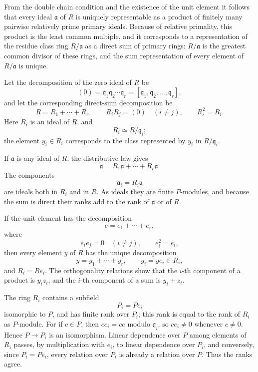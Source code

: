 \documentclass[11pt]{article}
\begin{document}
From the double chain condition and the existence of the unit element it
follows that every ideal \(\mathfrak a\) of \(R\) is uniquely
representable as a product of finitely many pairwise relatively prime
primary ideals. Because of relative primality, this product is the least
common multiple, and it corresponds to a representation of the residue
class ring \(R/\mathfrak a\) as a direct sum of primary rings:
\(R/\mathfrak a\) is the greatest common divisor of these rings, and the
sum representation of every element of \(R/\mathfrak a\) is unique.

Let the decomposition of the zero ideal of \(R\) be \[
  (0)=\mathfrak q_1\mathfrak q_2\cdots\mathfrak q_r
      =[\mathfrak q_1,\mathfrak q_2,\ldots,\mathfrak q_r],
\] and let the corresponding direct-sum decomposition be \[
  R=R_1+
  \cdots+R_r,
  \qquad R_i R_j=(0)\quad (i\ne j),
  \qquad R_i^2=R_i.
\] Here \(R_i\) is an ideal of \(R\), and \[
  R_i\simeq R/\mathfrak q_i;
\] the element \(y_i\in R_i\) corresponds to the class represented by
\(y_i\) in \(R/\mathfrak q_i\).

If \(\mathfrak a\) is any ideal of \(R\), the distributive law gives \[
  \mathfrak a=R_1\mathfrak a+
  \cdots+R_r\mathfrak a.
\] The components \[
  \mathfrak a_i=R_i\mathfrak a
\] are ideals both in \(R_i\) and in \(R\). As ideals they are finite
\(P\)-modules, and because the sum is direct their ranks add to the rank
of \(\mathfrak a\) or of \(R\).

If the unit element has the decomposition \[
  e=e_1+
\cdots+e_r,
\] where \[
  e_i e_j=0\quad(i\ne j),
  \qquad e_i^2=e_i,
\] then every element \(y\) of \(R\) has the unique decomposition \[
  y=y_1+
\cdots+y_r,
  \qquad y_i=ye_i\in R_i,
\] and \(R_i=Re_i\). The orthogonality relations show that the \(i\)-th
component of a product is \(y_i z_i\), and the \(i\)-th component of a
sum is \(y_i+z_i\).

The ring \(R_i\) contains a subfield \[
  P_i=Pe_i
\] isomorphic to \(P\), and has finite rank over \(P_i\); this rank is
equal to the rank of \(R_i\) as \(P\)-module. For if \(c\in P\), then
\(ce_i=ce\) modulo \(\mathfrak q_i\), so \(ce_i\ne0\) whenever
\(c\ne0\). Hence \(P\to P_i\) is an isomorphism. Linear dependence over
\(P\) among elements of \(R_i\) passes, by multiplication with \(e_i\),
to linear dependence over \(P_i\), and conversely, since \(P_i=Pe_i\),
every relation over \(P_i\) is already a relation over \(P\). Thus the
ranks agree.
\end{document}
